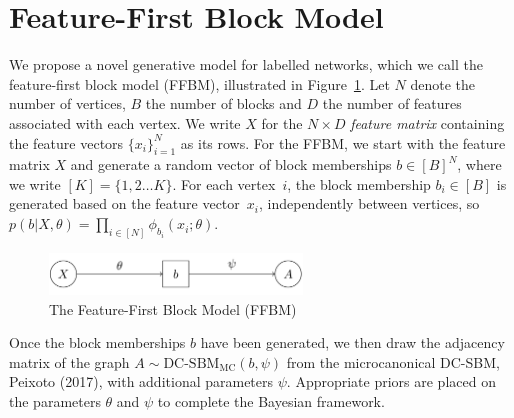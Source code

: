 \section{Feature-First Block Model}

We propose a novel generative model for labelled networks, which we call the feature-first block model (FFBM),
illustrated in Figure~\ref{fig:ffbm}.
Let $N$ denote the number of vertices, $B$ the number of blocks
and $D$ the number of features associated with each vertex.
We write $X$ for the $N\times D$ {\em feature matrix} containing
the feature vectors $\{x_i\}_{i=1}^{N}$ 
as its rows.
%
For the FFBM, we start with the feature matrix $X$ and generate a random
vector of block memberships $b \in [B]^N$, where we write $[K] = \{1, 2 \dots K\}$. For each vertex~$i$, the
block membership $b_i\in[B]$ is generated based on the feature
vector~$x_i$, independently between vertices, so
$p(b| X, \theta) = \prod_{i \in [N]} \phi_{b_i} (x_i; \theta)$.
%
\begin{figure}[!ht]
	\centering
%		
	\includegraphics[width=0.6\textwidth]{img/ffbm.png}
	\caption{The Feature-First Block Model (FFBM)}
	\label{fig:ffbm}
\end{figure}

Once the block memberships $b$ have been generated, we then draw the 
adjacency matrix of the graph 
	$A \sim \textrm{DC-SBM}_{\textrm{MC}} (b, \psi)$
from the microcanonical DC-SBM, Peixoto (2017), with additional parameters 
$\psi$.
Appropriate priors are placed on the parameters $\theta$ and $\psi$ to 
complete the Bayesian framework.
